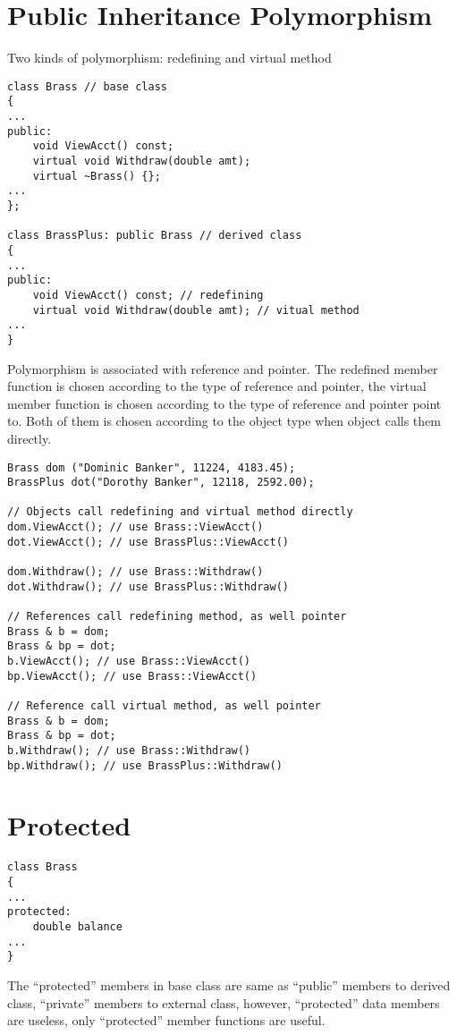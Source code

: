 \documentclass[10pt,a4paper,oneside]{article}
\begin{document}
\section{Public Inheritance Polymorphism}
Two kinds of polymorphism: redefining and virtual method
\begin{lstlisting}
class Brass // base class
{
...
public:
    void ViewAcct() const;
    virtual void Withdraw(double amt);
    virtual ~Brass() {};
...
};

class BrassPlus: public Brass // derived class
{
...
public:
    void ViewAcct() const; // redefining
    virtual void Withdraw(double amt); // vitual method
...
}
\end{lstlisting}
Polymorphism is associated with reference and pointer. The redefined member function is chosen according to the type of reference and pointer, the virtual member function is chosen according to the type of reference and pointer point to. Both of them is chosen according to the object type when object calls them directly.
\begin{lstlisting}
Brass dom ("Dominic Banker", 11224, 4183.45);
BrassPlus dot("Dorothy Banker", 12118, 2592.00);

// Objects call redefining and virtual method directly
dom.ViewAcct(); // use Brass::ViewAcct()
dot.ViewAcct(); // use BrassPlus::ViewAcct()

dom.Withdraw(); // use Brass::Withdraw()
dot.Withdraw(); // use BrassPlus::Withdraw()

// References call redefining method, as well pointer
Brass & b = dom;
Brass & bp = dot;
b.ViewAcct(); // use Brass::ViewAcct()
bp.ViewAcct(); // use Brass::ViewAcct()

// Reference call virtual method, as well pointer
Brass & b = dom;
Brass & bp = dot;
b.Withdraw(); // use Brass::Withdraw()
bp.Withdraw(); // use BrassPlus::Withdraw()
\end{lstlisting}
\section{Protected}
\begin{lstlisting}
class Brass
{
...
protected:
    double balance
...
}
\end{lstlisting}
The ``protected'' members in base class are same as ``public'' members to derived class, ``private'' members to external class, however, ``protected'' data members are useless, only ``protected'' member functions are useful.
\end{document}
